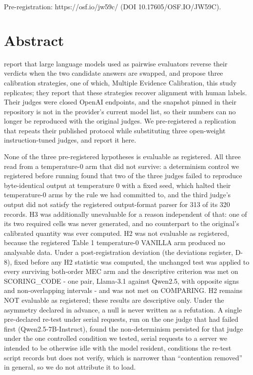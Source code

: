 Pre-registration: https://osf.io/jw59c/ (DOI 10.17605/OSF.IO/JW59C).

\section{Abstract}\label{abstract}

\textcite{wang2024} report that large language models used as pairwise evaluators reverse their
verdicts when the two candidate answers are swapped, and propose three calibration strategies, one of which, Multiple Evidence Calibration, this study replicates; they report that these
strategies recover alignment with human labels. Their judges were closed OpenAI endpoints, and the snapshot
pinned in their repository is not in the provider's current model list, so their numbers can no longer be reproduced with the original judges.
We pre-registered a replication that repeats their published protocol while substituting three
open-weight instruction-tuned judges, and report it here.

None of the three pre-registered hypotheses is evaluable as registered. All three read from a
temperature-0 arm that did not survive: a determinism control we registered
before running found that two of the three judges failed to reproduce byte-identical output at
temperature 0 with a fixed seed, which halted their temperature-0 arms by the rule we had committed
to, and the third judge's output did not satisfy the registered output-format parser for 313 of its
320 records. H3 was additionally unevaluable for a reason independent of that: one of its two
required cells was never generated, and no counterpart to the original's calibrated quantity was
ever computed. H2 was not evaluable as registered, because the registered Table 1 temperature-0 VANILLA arm
produced no analysable data. Under a post-registration deviation (the deviations register, D-8), fixed before any
H2 statistic was computed, the unchanged test was applied to every surviving both-order MEC arm and
the descriptive criterion was met on SCORING\_CODE - one pair, Llama-3.1 against Qwen2.5, with
opposite signs and non-overlapping intervals - and was not met on COMPARING. H2 remains NOT
evaluable as registered; these results are descriptive only.
Under the asymmetry declared in advance, a null is never written as a refutation. A single pre-declared re-test
under serial requests, run on the one judge that had failed first (Qwen2.5-7B-Instruct), found the
non-determinism persisted for that judge under the one controlled condition we tested, serial requests to a server we intended to be otherwise idle with the model resident, conditions the re-test script records but does not verify, which is narrower than ``contention removed'' in general, so we do not attribute it to
load.

